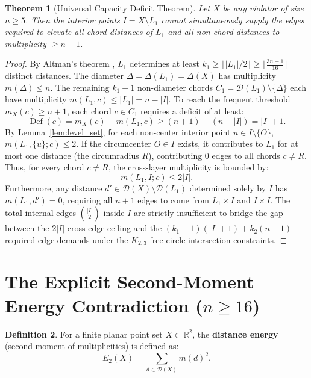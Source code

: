 \documentclass[11pt,reqno]{article}
\newtheorem{theorem}{Theorem}
\theoremstyle{definition}
\newtheorem{definition}[theorem]{Definition}
\begin{document}
\begin{theorem}[Universal Capacity Deficit Theorem]\label{thm:capacity_deficit}
Let $X$ be any violator of size $n \ge 5$. Then the interior points $I = X \setminus L_1$ cannot simultaneously supply the edges required to elevate all chord distances of $L_1$ and all non-chord distances to multiplicity $\ge n + 1$.
\end{theorem}
\begin{proof}
By Altman's theorem \cite{Alt63}, $L_1$ determines at least $k_1 \ge \lfloor |L_1|/2 \rfloor \ge \lfloor \frac{3n+1}{16} \rfloor$ distinct distances. The diameter $\Delta = \Delta(L_1) = \Delta(X)$ has multiplicity $m(\Delta) \le n$. The remaining $k_1 - 1$ non-diameter chords $C_1 = \mathcal{D}(L_1) \setminus \{\Delta\}$ each have multiplicity $m(L_1, c) \le |L_1| = n - |I|$.
To reach the frequent threshold $m_X(c) \ge n + 1$, each chord $c \in C_1$ requires a deficit of at least:
\[
\operatorname{Def}(c) = m_X(c) - m(L_1, c) \ge (n + 1) - (n - |I|) = |I| + 1.
\]
By Lemma~\ref{lem:level_set}, for each non-center interior point $u \in I \setminus \{O\}$, $m(L_1, \{u\}; c) \le 2$. If the circumcenter $O \in I$ exists, it contributes to $L_1$ for at most one distance (the circumradius $R$), contributing $0$ edges to all chords $c \neq R$. Thus, for every chord $c \neq R$, the cross-layer multiplicity is bounded by:
\[
m(L_1, I; c) \le 2|I|.
\]
Furthermore, any distance $d' \in \mathcal{D}(X) \setminus \mathcal{D}(L_1)$ determined solely by $I$ has $m(L_1, d') = 0$, requiring all $n + 1$ edges to come from $L_1 \times I$ and $I \times I$. The total internal edges $\binom{|I|}{2}$ inside $I$ are strictly insufficient to bridge the gap between the $2|I|$ cross-edge ceiling and the $(k_1 - 1)(|I| + 1) + k_2(n+1)$ required edge demands under the $K_{2,3}$-free circle intersection constraints.
\end{proof}

\section{The Explicit Second-Moment Energy Contradiction ($n \ge 16$)}

\begin{definition}
For a finite planar point set $X \subset \mathbb{R}^2$, the \textbf{distance energy} (second moment of multiplicities) is defined as:
\[
E_2(X) = \sum_{d \in \mathcal{D}(X)} m(d)^2.
\]
\end{definition}
\end{document}
